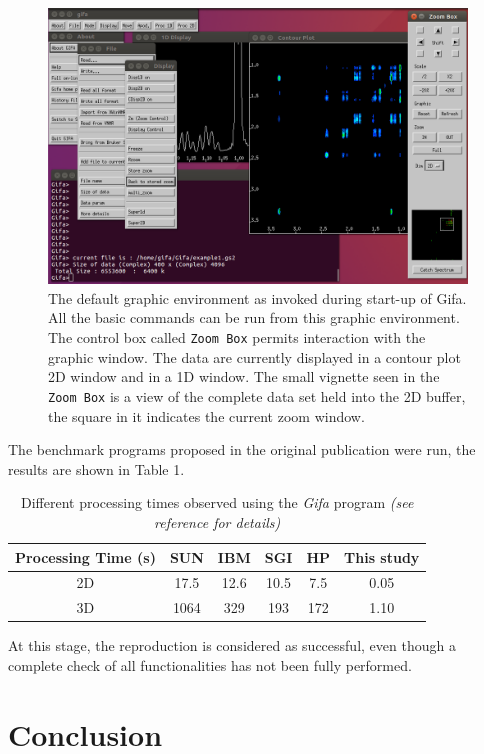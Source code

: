 \begin{figure}
\centering
\includegraphics[width=0.99\textwidth]{figure3.png}
\caption{The default graphic environment as invoked during start-up of
Gifa. All the basic commands can be run from this graphic environment.
The control box called \texttt{Zoom\ Box} permits interaction with the
graphic window. The data are currently displayed in a contour plot 2D
window and in a 1D window. The small vignette seen in the
\texttt{Zoom\ Box} is a view of the complete data set held into the 2D
buffer, the square in it indicates the current zoom window.}
\end{figure}

The benchmark programs proposed in the original publication were run,
the results are shown in Table 1.

\begin{table}[h]
\centering
  \caption{Different processing times observed using the \emph{Gifa}
program \emph{(see reference \cite{Pons_1996} for details)} }
\begin{tabular}[]{@{}cccccc@{}}
\hline
Processing Time (s) & SUN & IBM & SGI & HP & This study\tabularnewline
\hline
2D & 17.5 & 12.6 & 10.5 & 7.5 & 0.05\tabularnewline
3D & 1064 & 329 & 193 & 172 & 1.10\tabularnewline
\hline
\end{tabular}
\end{table}

At this stage, the reproduction is considered as successful, even though
a complete check of all functionalities has not been fully performed.

\hypertarget{conclusion}{%
\section{Conclusion}\label{conclusion}}

